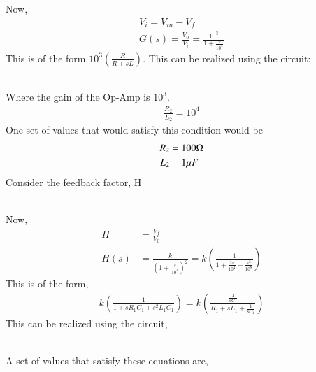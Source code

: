 \begin{enumerate}[label=\thesection.\arabic*.,ref=\thesection.\theenumi]
Now, 
\begin{align}
V_i=V_{in}-V_f\\
G(s)=\frac{V_0}{V_i}= \frac{10^3}{1+\frac{s}{10^4}}
\end{align}
This is of the form $10^3 \left(\frac{R}{R+sL}\right)$.
This can be realized using the circuit:
\begin{figure}[!ht]
	\begin{center}
		\resizebox{\columnwidth}{!}{}
	\end{center}
\caption{}
\label{fig:ee18btech11006_3}
\end{figure} \\
Where the gain of the Op-Amp is $10^3$.
\begin{align}
    \frac{R_2}{L_2}=10^4
\end{align}
One set of values that would satisfy this condition would be 
\begin{align}
    R_2&= 100\ohm \\
    L_2&=1 \mu F
\end{align}
Consider the feedback factor, H \newline
\begin{figure}[!ht]
	\begin{center}
		\resizebox{\columnwidth}{!}{}
	\end{center}
\caption{}
\label{fig:ee18btech11006_5}
\end{figure} \\
Now, 
\begin{align}
H&=\frac{V_f}{V_0}\\
H(s)&= \frac{k}{\left(1+\frac{s}{10^4}\right)^2} = k\left({\frac{1}{1+\frac{2s}{10^4}+\frac{s^2}{10^8}}}\right)  
\end{align}
This is of the form,
\begin{align}
k\left(\frac{1}{1+s{R_1}{C_1}+{s^2}{L_1}{C_1}}\right) =  k\left(\frac{\frac{1}{s{C_1}}}{{R_1}+s{L_1}+\frac{1}{s{C_1}}}\right)  
\end{align}
This can be realized using the circuit,
\begin{figure}[!ht]
	\begin{center}
		\resizebox{\columnwidth}{!}{}
	\end{center}
\caption{}
\label{fig:ee18btech11006_2}
\end{figure} \\
A set of values that satisfy these equations are,

\end{enumerate}
